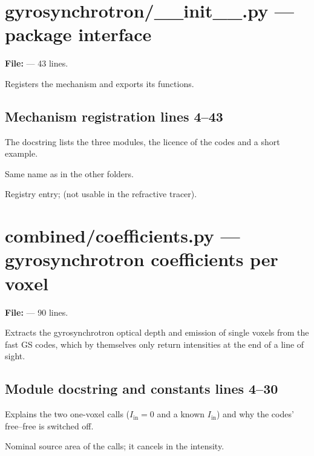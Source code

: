 \chapter{gyrosynchrotron/\_\_init\_\_.py --- package interface}
\label{mod:gyrosynchrotron:init.py}
\textbf{File:}  --- 43 lines.

Registers the mechanism and exports its functions.

\section*{\normalsize Mechanism registration \hfill{\small\mdseries\color{gray}lines 4--43}}

The docstring lists the three modules, the licence of the codes and a short example.

\begin{lines}
\item[L.32] Same name as in the other folders.
\item[L.34] Registry entry;  (not usable in the refractive tracer).
\end{lines}

\chapter{combined/coefficients.py --- gyrosynchrotron coefficients per voxel}
\label{mod:combined:coefficients.py}
\textbf{File:}  --- 90 lines.

Extracts the gyrosynchrotron optical depth and emission of single voxels from the fast
GS codes, which by themselves only return intensities at the end of a line of sight.

\section*{\normalsize Module docstring and constants \hfill{\small\mdseries\color{gray}lines 4--30}}

Explains the two one-voxel calls ($I_\text{in}=0$ and a known $I_\text{in}$) and why the codes' free--free is switched off.

\begin{lines}
\item[L.30] Nominal source area of the calls; it cancels in the intensity.
\end{lines}

